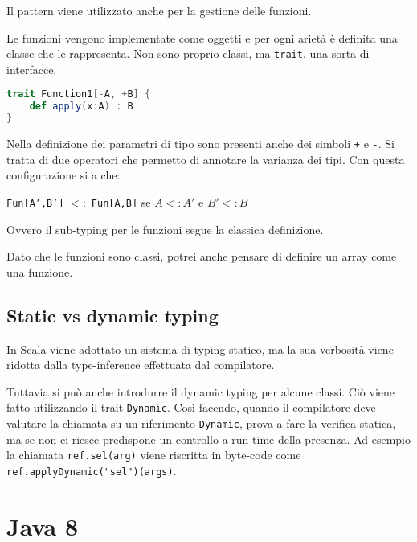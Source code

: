 


Il pattern viene utilizzato anche per la gestione delle funzioni.


Le funzioni vengono implementate come oggetti e per ogni arietà è definita una classe che le rappresenta. Non sono proprio classi, ma \texttt{trait}, una sorta di interfacce.

\begin{lstlisting}[language=Scala]
trait Function1[-A, +B] {
	def apply(x:A) : B
}
\end{lstlisting}

Nella definizione dei parametri di tipo sono presenti anche dei simboli \texttt{+} e \texttt{-}. Si tratta di due operatori che permetto di annotare la varianza dei tipi. Con questa configurazione si a che:

\begin{center}
\texttt{Fun[A',B']} $<:$ \texttt{Fun[A,B]} se $A <: A'$ e $B' <: B$
\end{center}

Ovvero il sub-typing per le funzioni segue la classica definizione.

Dato che le funzioni sono classi, potrei anche pensare di definire un array come una funzione.


\section{Static vs dynamic typing}

In Scala viene adottato un sistema di typing statico, ma la sua verbosità viene ridotta dalla type-inference effettuata dal compilatore.

Tuttavia si può anche introdurre il dynamic typing per alcune classi. Ciò viene fatto utilizzando il trait \texttt{Dynamic}. Così facendo, quando il compilatore deve valutare la chiamata su un riferimento \texttt{Dynamic}, prova a fare la verifica statica, ma se non ci riesce predispone un controllo a run-time della presenza.
Ad esempio la chiamata \texttt{ref.sel(arg)} viene riscritta in byte-code come \texttt{ref.applyDynamic("sel")(args)}.

\chapter{Java 8}

